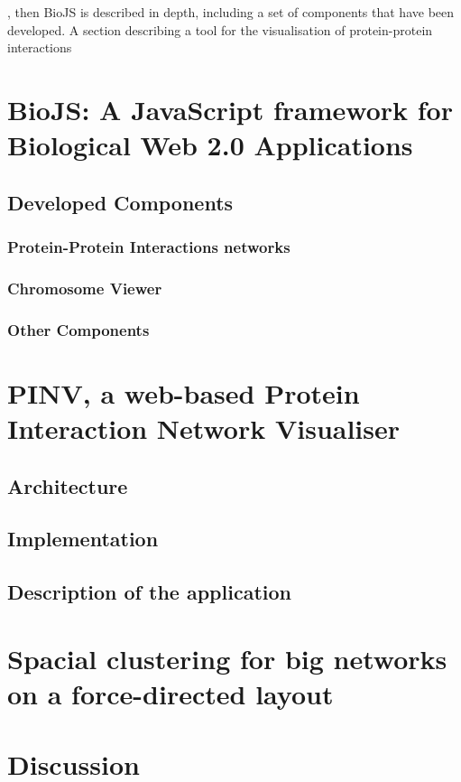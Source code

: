 

, then BioJS is described in depth, including a set of components that have been developed. A section describing a tool for the visualisation of protein-protein interactions 


\section{BioJS: A JavaScript framework for Biological Web 2.0 Applications }
\subsection{Developed Components}
\subsubsection{Protein-Protein Interactions networks}
\subsubsection{Chromosome Viewer}
\subsubsection{Other Components}

\section{PINV, a web-based Protein Interaction Network Visualiser }
\subsection{Architecture}
\subsection{Implementation}
\subsection{Description of the application}

\section{Spacial clustering for big networks on a force-directed layout}

\section{Discussion}



